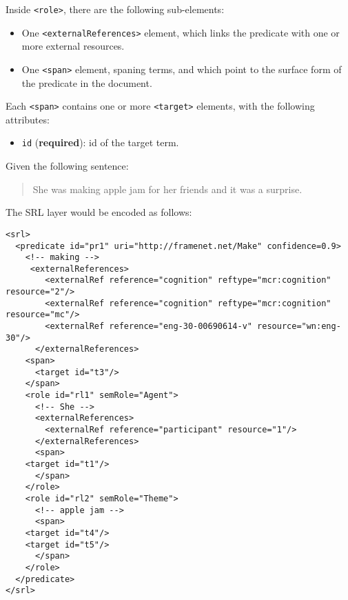 Inside \texttt{<role>}, there are the following sub-elements:
\begin{itemize}
\item One \texttt{<externalReferences>} element, which links the predicate
  with one or more external resources.
\item One \texttt{<span>} element, spaning terms, and which point to the
  surface form of the predicate in the document.
\end{itemize}

Each \texttt{<span>} contains one or more \texttt{<target>}
elements, with the following attributes:

\begin{itemize}
\item \texttt{id} (\textbf{required}): id of the target term.
\end{itemize}

Given the following sentence:

\begin{quote}
  She was making apple jam for her friends and it was a surprise.
\end{quote}

The SRL layer would be encoded as follows:

\begin{Verbatim}[fontsize=\small]
<srl>
  <predicate id="pr1" uri="http://framenet.net/Make" confidence=0.9>
    <!-- making -->
     <externalReferences>
        <externalRef reference="cognition" reftype="mcr:cognition" resource="2"/>
        <externalRef reference="cognition" reftype="mcr:cognition" resource="mc"/>
        <externalRef reference="eng-30-00690614-v" resource="wn:eng-30"/>
      </externalReferences>
    <span>
      <target id="t3"/>
    </span>
    <role id="rl1" semRole="Agent">
      <!-- She -->
      <externalReferences>
        <externalRef reference="participant" resource="1"/>
      </externalReferences>
      <span>
	<target id="t1"/>
      </span>
    </role>
    <role id="rl2" semRole="Theme">
      <!-- apple jam -->
      <span>
	<target id="t4"/>
	<target id="t5"/>
      </span>
    </role>
  </predicate>
</srl>
\end{Verbatim}


